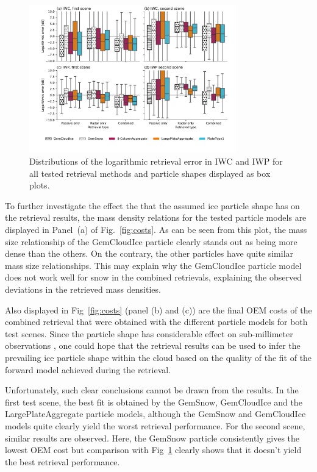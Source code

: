 \documentclass[journal abbreviation, manuscript]{copernicus}
\begin{document}
\begin{figure}[!h]
\centering
\includegraphics[width = 0.8\textwidth]{../plots/results_box}
\caption{Distributions of the logarithmic retrieval error in IWC and IWP for all tested retrieval
  methods and particle shapes displayed as box plots.}
\label{fig:boxes}
\end{figure}


To further investigate the effect the that the assumed ice particle shape has
on the retrieval results, the mass density relations for the tested particle
models are displayed in Panel~(a) of Fig.~\ref{fig:costs}. As can be seen from
this plot, the mass size relationship of the GemCloudIce particle clearly
stands out as being more dense than the others. On the contrary, the other
particles have quite similar mass size relationships. This may explain why
the GemCloudIce particle model does not work well for snow in the combined
retrievals, explaining the observed deviations in the retrieved mass densities.

Also displayed in Fig~\ref{fig:costs} (panel (b) and (c)) are the final OEM
costs of the combined retrieval that were obtained with the different particle
models for both test scenes. Since the particle shape has considerable effect on
sub-millimeter observations \citep{ekelund19}, one could hope that the retrieval results can be
used to infer the prevailing ice particle shape within the cloud based on the
quality of the fit of the forward model achieved during the retrieval.

Unfortunately, such clear conclusions cannot be drawn from the results. In the
first test scene, the best fit is obtained by the GemSnow, GemCloudIce and the
LargePlateAggregate particle models, although the GemSnow and GemCloudIce models
quite clearly yield the worst retrieval performance. For the second scene,
similar results are observed. Here, the GemSnow particle consistently gives the
lowest OEM cost but comparison with Fig~\ref{fig:boxes} clearly shows that it
doesn't yield the best retrieval performance.
\end{document}
